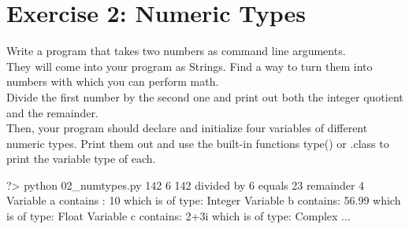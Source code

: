 \documentclass{42-en}
\begin{document}
\chapter{Exercise 2: Numeric Types}
\makeheaderfiles

Write a program that takes two numbers as command line arguments.\\

They will come into your program as Strings. Find a way to turn them into numbers with which you can perform math.\\

Divide the first number by the second one and print out both the integer quotient and the remainder.\\

Then, your program should declare and initialize four variables of different numeric types.
Print them out and use the built-in functions type() or .class to print the variable type of each.

\begin{42console}
	?> python 02\_numtypes.py 142 6
	142 divided by 6 equals 23 remainder 4
	Variable a contains : 10  which is of type: Integer
	Variable b contains: 56.99  which is of type: Float
	Variable c contains: 2+3i  which is of type: Complex
	...
\end{42console}


\nextexercice
\newpage



\end{document}
